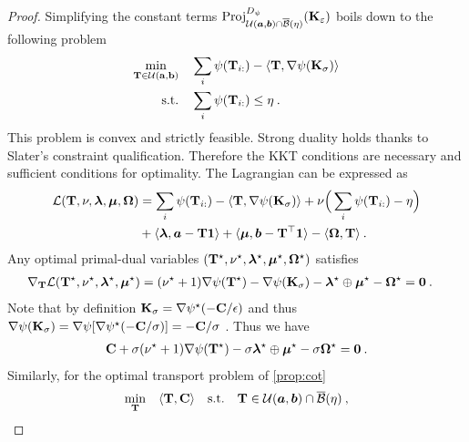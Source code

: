\begin{proof}    
    Simplifying the constant terms $\operatorname{Proj}^{D_\psi}_{{\mathcal{U}}(\bm{a}, \bm{b}) \cap \overline{\mathcal{B}}(\eta)}({\mathbf{K}}_\varepsilon)$ boils down to the following problem
    \begin{align}
        \min_{{\mathbf{T}} \in {\mathcal{U}}({\mathbf{a}}, {\mathbf{b}})} \quad &\sum_i \psi({\mathbf{T}}_{i:}) - \langle {\mathbf{T}}, \nabla \psi({\mathbf{K}}_\sigma) \rangle \\
        \text{s.t.} \quad &\sum_i \psi({\mathbf{T}}_{i:}) \leq \eta \:.
    \end{align}
    This problem is convex and strictly feasible. Strong duality holds thanks to Slater's constraint qualification. Therefore the KKT conditions \citep{boyd2004convex} are necessary and sufficient conditions for optimality.
    The Lagrangian can be expressed as
    \begin{align}
        \mathcal{L}({\mathbf{T}}, \nu, \bm{\lambda}, \bm{\mu}, \mathbf{\Omega}) &= \sum_i \psi({\mathbf{T}}_{i:}) - \langle {\mathbf{T}}, \nabla \psi({\mathbf{K}}_\sigma) \rangle + \nu\Big(\sum_i \psi({\mathbf{T}}_{i:}) - \eta \Big) \\
        &+ \langle \bm{\lambda}, \bm{a} - {\mathbf{T}} \bm{1} \rangle + \langle \bm{\mu}, \bm{b} - {\mathbf{T}}^\top \bm{1} \rangle - \langle \mathbf{\Omega}, {\mathbf{T}} \rangle \:.
    \end{align}
    Any optimal primal-dual variables $({\mathbf{T}}^\star, \nu^\star, \bm{\lambda}^\star, \bm{\mu}^\star, \mathbf{\Omega}^\star)$ satisfies
    \begin{align}
            \nabla_{{\mathbf{T}}} \mathcal{L}({\mathbf{T}}^\star,  \nu^\star, \bm{\lambda}^\star, \bm{\mu}^\star) &=  (\nu^\star + 1) \nabla \psi({\mathbf{T}}^\star) - \nabla \psi({\mathbf{K}}_\sigma) - \bm{\lambda}^\star \oplus \bm{\mu}^\star - \mathbf{\Omega}^\star = \bm{0} \:.
    \end{align}
    Note that by definition ${\mathbf{K}}_\sigma = \nabla \psi^\star(-{\mathbf{C}}/\epsilon)$ and thus $\nabla \psi({\mathbf{K}}_\sigma) = \nabla \psi[\nabla \psi^\star(-{\mathbf{C}}/\sigma)] = -{\mathbf{C}} / \sigma$ \citep{rockafellar1997convex}. Thus we have 
    \begin{align}
        {\mathbf{C}} + \sigma (\nu^\star + 1) \nabla \psi({\mathbf{T}}^\star) -  \sigma \bm{\lambda}^\star \oplus \bm{\mu}^\star - \sigma \mathbf{\Omega}^\star= \bm{0} \:.
    \end{align}
    Similarly, for the optimal transport problem of \eqref{prop:cot}
    \begin{align}
        \min_{\mT} \quad \langle \mT, \mC \rangle \quad \text{s.t.} \quad  \mT \in \gU(\bm{a}, \bm{b}) \cap \overline{\mathcal{B}}(\eta) \:,

\end{align}
\end{proof}
